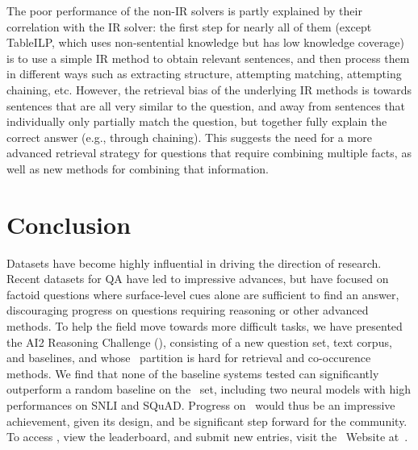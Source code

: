 The poor performance of the non-IR solvers is partly explained by their correlation with the IR solver: the first step for nearly all of them (except TableILP, which uses non-sentential knowledge but has low knowledge coverage) is to use a simple IR method to obtain relevant 
sentences, and then process them in different ways such as extracting structure, attempting matching, attempting chaining, etc. However, the retrieval bias of the underlying IR methods is towards sentences that are all very similar to the question, and away from sentences that individually only partially match the question, but together fully explain the correct answer (e.g., through chaining). This suggests the need for a more advanced retrieval strategy for questions that require combining multiple facts, as well as new methods for combining that information.

\section{Conclusion}

Datasets have become highly influential in driving the direction of research.
Recent datasets for QA have led to impressive advances, but have 
focused on factoid questions where surface-level cues alone are
sufficient to find an answer, discouraging progress on questions
requiring reasoning or other advanced methods. To help the field
move towards more difficult tasks, we have presented the AI2 Reasoning Challenge (\ASC),
consisting of a new question set, text corpus, and baselines,
and whose \Challenge~partition is hard for retrieval and
co-occurence methods. We find that none of the baseline systems
tested can significantly outperform a random baseline on the \Challenge~set,
including two neural models with high performances on SNLI and SQuAD.
Progress on \ASC~would thus be an
impressive achievement, given its design, and be significant step
forward for the community. To access \ASC, view the leaderboard,
and submit new entries, visit the \ASC~Website at~\ascurl.

